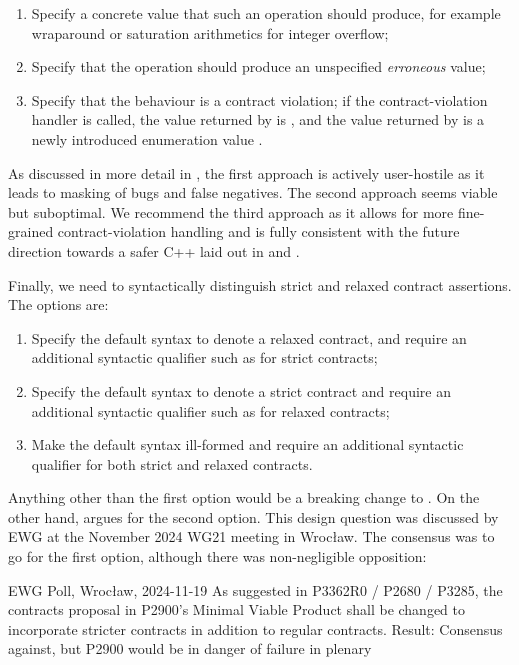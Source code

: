 \begin{enumerate}
\item Specify a concrete value that such an operation should produce, for example wraparound or saturation arithmetics for integer overflow;
\item Specify that the operation should produce an unspecified \emph{erroneous} value;
\item Specify that the behaviour is a contract violation; if the contract-violation handler is called, the value returned by  is , and the value returned by  is a newly introduced enumeration value .
\end{enumerate}

As discussed in more detail in \cite{P3386R0}, the first approach is actively user-hostile as it leads to masking of bugs and false negatives. The second approach seems viable but suboptimal. We recommend the third approach as it allows for more fine-grained contract-violation handling and is fully consistent with the future direction towards a safer C++ laid out in \cite{P3100R1} and \cite{P3229R0}.

Finally, we need to syntactically distinguish strict and relaxed contract assertions. The options are:
\begin{enumerate}
\item Specify the default syntax  to denote a relaxed contract, and require an additional syntactic qualifier such as  for strict contracts; 
\item Specify the default syntax  to denote a strict contract and require an additional syntactic qualifier such as  for relaxed contracts;
\item Make the default syntax ill-formed and require an additional syntactic qualifier for both strict and relaxed contracts.
\end{enumerate}

Anything other than the first option would be a breaking change to \cite{P2900R13}. On the other hand, \cite{P2680R1} argues for the second option. This design question was discussed by EWG at the November 2024 WG21 meeting in Wroc{\l}aw. The consensus was to go for the first option, although there was non-negligible opposition:

\begin{wgpoll}{{EWG Poll, Wroc{\l}aw, 2024-11-19}}
As suggested in P3362R0 / P2680 / P3285, the contracts proposal in P2900’s Minimal Viable Product shall be changed to incorporate stricter contracts in addition to regular contracts.
Result: Consensus against, but P2900 would be in danger of failure in plenary
\end{wgpoll}

